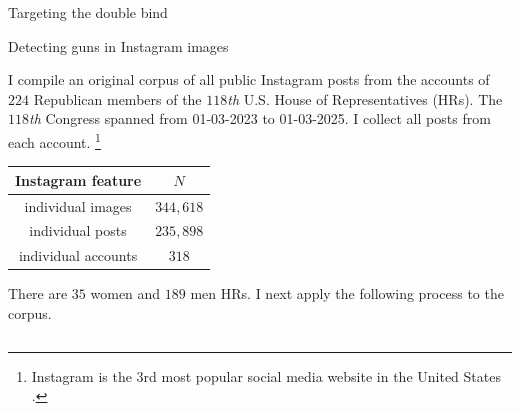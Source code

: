 \documentclass[final]{beamer}
\newlength{\colwidth}
\begin{document}
\begin{frame}[t]
\begin{columns}[t]
\begin{column}{\colwidth}
\begin{block}{Targeting the double bind}
\begin{center}
\end{center}
\end{block}


\begin{block}{Detecting guns in Instagram images}

I compile an original corpus of all public Instagram posts from the accounts of $224$ Republican members of the $118$\textit{th} U.S. House of Representatives (HRs). The $118$\textit{th} Congress spanned from 01-03-2023 to 01-03-2025. I collect all posts from each account. \footnote{\footnotesize{Instagram is the 3rd most popular social media website in the United States \cite{262a3e8a-f258-3b4a-a589-ce0f62893e5a}.}}

\begin{table}[!htb]
\centering
\label{tab:tab1}
\begin{tabular}{c|c}
\textbf{Instagram feature} & $N$ \\
\hline
individual images & $344,618$ \\ 
individual posts & $235,898$  \\
individual accounts & $318$  
\end{tabular}
\end{table}

There are $35$ women and $189$ men HRs. I next apply the following process to the corpus.


\end{block}
\end{column}
\end{columns}
\end{frame}
\end{document}

